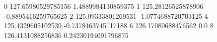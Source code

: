 0 127.65980529785156 1.4889984130859375
1 125.28126525878906 -0.8895416259765625
2 125.09333801269531 -1.0774688720703125
4 125.4329605102539 -0.7378463745117188
6 126.17080688476562 0.0
8 126.4131088256836 0.24230194091796875
